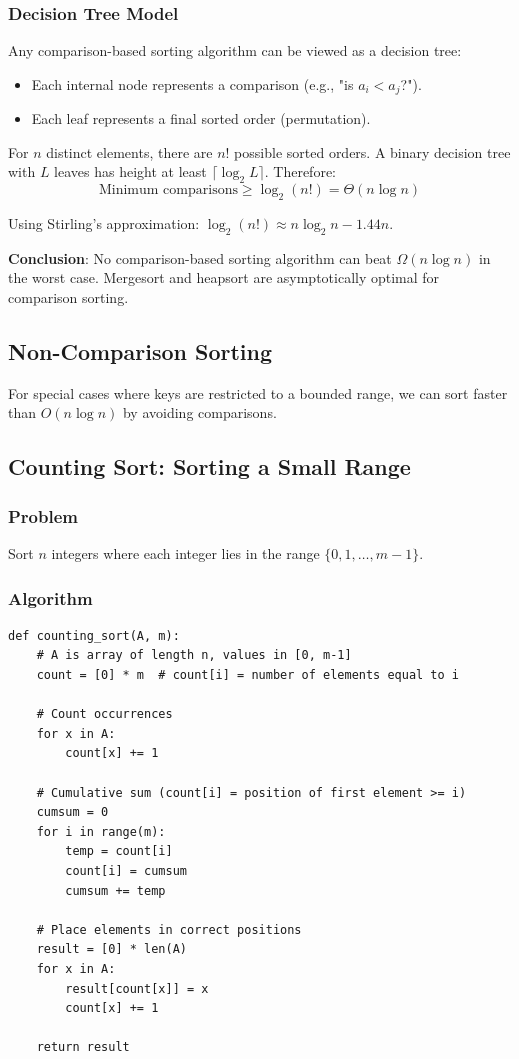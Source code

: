 \documentclass[11pt]{article}
\begin{document}
\subsubsection*{Decision Tree Model}
Any comparison-based sorting algorithm can be viewed as a decision tree:
\begin{itemize}
\item Each internal node represents a comparison (e.g., "is $a_i < a_j$?").
\item Each leaf represents a final sorted order (permutation).
\end{itemize}

For $n$ distinct elements, there are $n!$ possible sorted orders. A binary decision tree with $L$ leaves has height at least $\lceil \log_2 L \rceil$. Therefore:
\[
\text{Minimum comparisons} \ge \log_2(n!) = \Theta(n \log n)
\]

Using Stirling's approximation: $\log_2(n!) \approx n \log_2 n - 1.44n$.

\textbf{Conclusion}: No comparison-based sorting algorithm can beat $\Omega(n \log n)$ in the worst case. Mergesort and heapsort are asymptotically optimal for comparison sorting.

\subsection*{Non-Comparison Sorting}

For special cases where keys are restricted to a bounded range, we can sort faster than $O(n \log n)$ by avoiding comparisons.

\subsection*{Counting Sort: Sorting a Small Range}

\subsubsection*{Problem}
Sort $n$ integers where each integer lies in the range $\{0, 1, \ldots, m-1\}$.

\subsubsection*{Algorithm}
\begin{lstlisting}
def counting_sort(A, m):
    # A is array of length n, values in [0, m-1]
    count = [0] * m  # count[i] = number of elements equal to i
    
    # Count occurrences
    for x in A:
        count[x] += 1
    
    # Cumulative sum (count[i] = position of first element >= i)
    cumsum = 0
    for i in range(m):
        temp = count[i]
        count[i] = cumsum
        cumsum += temp
    
    # Place elements in correct positions
    result = [0] * len(A)
    for x in A:
        result[count[x]] = x
        count[x] += 1
    
    return result
\end{lstlisting}
\end{document}
